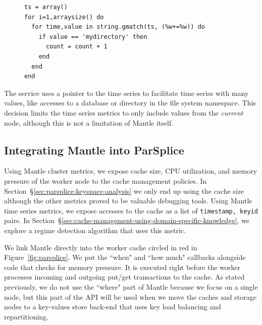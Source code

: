 \begin{figure}[h]
\footnotesize
\begin{verbatim}
ts = array()
for i=1,arraysize() do
  for time,value in string.gmatch(ts, (%w+=%w)) do
    if value == 'mydirectory' then
      count = count + 1
    end
  end
end
\end{verbatim}
\end{figure}

The service uses a pointer to the time series to facilitate time series with
many values, like accesses to a database or directory in the file system
namespace. This decision limits the time series metrics to only include values
from the {\it current } node, although this is not a limitation of Mantle
itself.

\subsection{Integrating Mantle into ParSplice}

Using Mantle cluster metrics, we expose cache size, CPU utilization, and memory
pressure of the worker node to the cache management policies. In
Section~\S\ref{sec:parsplice-keyspace-analysis} we only end up using the cache
size although the other metrics proved to be valuable debugging tools. Using
Mantle time series metrics, we expose accesses to the cache as a list of
\texttt{timestamp, keyid} pairs. In
Section~\S\ref{sec:cache-management-using-domain-specific-knowledge}, we
explore a regime detection algorithm that uses this metric.

We link Mantle directly into the worker cache circled in red in
Figure~\ref{fig:parsplice}. We put the ``when" and ``how much" callbacks
alongside code that checks for memory pressure. It is executed right before the
worker processes incoming and outgoing put/get transactions to the cache. As
stated previously, we do not use the ``where" part of Mantle because we focus
on a single node, but this part of the API will be used when we move the caches
and storage nodes to a key-values store back-end that uses key load balancing and
repartitioning.
